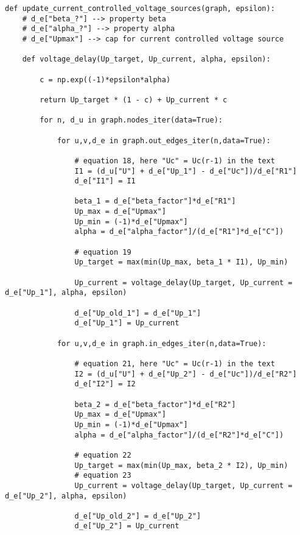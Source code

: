 \begin{codesnippet}
\begin{verbatim}
def update_current_controlled_voltage_sources(graph, epsilon):
	# d_e["beta_?"] --> property beta
	# d_e["alpha_?"] --> property alpha
	# d_e["Upmax"] --> cap for current controlled voltage source
	
	def voltage_delay(Up_target, Up_current, alpha, epsilon):
		
		c = np.exp((-1)*epsilon*alpha)
		
		return Up_target * (1 - c) + Up_current * c

		for n, d_u in graph.nodes_iter(data=True):

			for u,v,d_e in graph.out_edges_iter(n,data=True):

				# equation 18, here "Uc" = Uc(r-1) in the text
				I1 = (d_u["U"] + d_e["Up_1"] - d_e["Uc"])/d_e["R1"]
				d_e["I1"] = I1

				beta_1 = d_e["beta_factor"]*d_e["R1"]
				Up_max = d_e["Upmax"]
				Up_min = (-1)*d_e["Upmax"]
				alpha = d_e["alpha_factor"]/(d_e["R1"]*d_e["C"])

				# equation 19
				Up_target = max(min(Up_max, beta_1 * I1), Up_min)
	
				Up_current = voltage_delay(Up_target, Up_current = d_e["Up_1"], alpha, epsilon)

				d_e["Up_old_1"] = d_e["Up_1"]
				d_e["Up_1"] = Up_current

			for u,v,d_e in graph.in_edges_iter(n,data=True):

				# equation 21, here "Uc" = Uc(r-1) in the text
				I2 = (d_u["U"] + d_e["Up_2"] - d_e["Uc"])/d_e["R2"]
				d_e["I2"] = I2

				beta_2 = d_e["beta_factor"]*d_e["R2"]
				Up_max = d_e["Upmax"]
				Up_min = (-1)*d_e["Upmax"]
				alpha = d_e["alpha_factor"]/(d_e["R2"]*d_e["C"])

				# equation 22
				Up_target = max(min(Up_max, beta_2 * I2), Up_min)
				# equation 23
				Up_current = voltage_delay(Up_target, Up_current = d_e["Up_2"], alpha, epsilon)

				d_e["Up_old_2"] = d_e["Up_2"]
				d_e["Up_2"] = Up_current
\end{verbatim}

	\label{code:current_controlled_voltage_sources}
\end{codesnippet}



